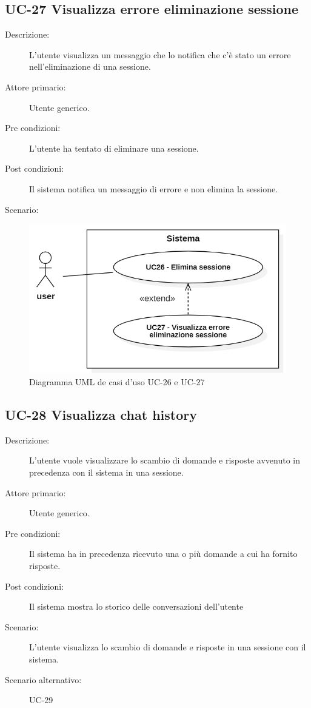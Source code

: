 \subsection{UC-27 Visualizza errore eliminazione sessione }
\begin{description}
    \item[Descrizione:] L'utente visualizza un messaggio che lo notifica che c'è stato un errore nell'eliminazione di una sessione.
    \item[Attore primario:] Utente generico.
    \item[Pre condizioni:] L'utente ha tentato di eliminare una sessione.
    \item[Post condizioni:] Il sistema notifica un messaggio di errore e non elimina la sessione.
    \item[Scenario:] 
\end{description}

\begin{figure}[H]
    \centering
    \includegraphics[width=0.9\linewidth]{UC26-27.PNG}
    \caption{Diagramma UML de casi d'uso UC-26 e UC-27}
    \label{fig:UC26-27}
\end{figure}

\subsection{UC-28 Visualizza chat history}
\begin{description}
    \item[Descrizione:] L'utente vuole visualizzare lo scambio di domande e risposte avvenuto in precedenza con il sistema in una sessione.
    \item[Attore primario:] Utente generico.
    \item[Pre condizioni:] Il sistema ha in precedenza ricevuto una o più domande a cui ha fornito risposte.
    \item[Post condizioni:] Il sistema mostra lo storico delle conversazioni dell'utente
    \item[Scenario:] L'utente visualizza lo scambio di domande e risposte in una sessione con il sistema.
    \item[Scenario alternativo:] UC-29
\end{description} 

